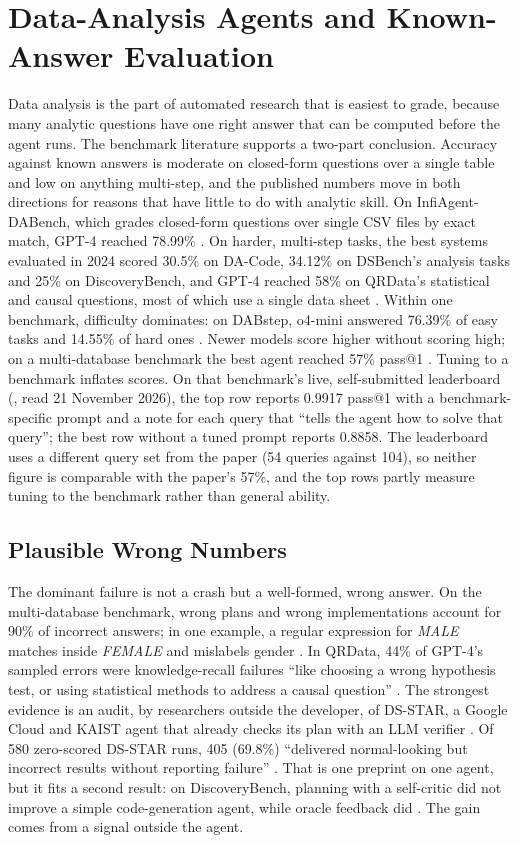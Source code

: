 \section{Data-Analysis Agents and Known-Answer Evaluation}\label{sec:data}

Data analysis is the part of automated research that is easiest to grade, because many analytic questions have one right answer that can be computed before the agent runs. The benchmark literature supports a two-part conclusion. Accuracy against known answers is moderate on closed-form questions over a single table and low on anything multi-step, and the published numbers move in both directions for reasons that have little to do with analytic skill. On InfiAgent-DABench, which grades closed-form questions over single CSV files by exact match, GPT-4 reached 78.99\% \citep{D1}. On harder, multi-step tasks, the best systems evaluated in 2024 scored 30.5\% on DA-Code, 34.12\% on DSBench's analysis tasks and 25\% on DiscoveryBench, and GPT-4 reached 58\% on QRData's statistical and causal questions, most of which use a single data sheet \citep{D2,D3,D6,D14}. Within one benchmark, difficulty dominates: on DABstep, o4-mini answered 76.39\% of easy tasks and 14.55\% of hard ones \citep{D9}. Newer models score higher without scoring high; on a multi-database benchmark the best agent reached 57\% pass@1 \citep{D11}. Tuning to a benchmark inflates scores. On that benchmark's live, self-submitted leaderboard (, read 21 November 2026), the top row reports 0.9917 pass@1 with a benchmark-specific prompt and a note for each query that ``tells the agent how to solve that query''; the best row without a tuned prompt reports 0.8858. The leaderboard uses a different query set from the paper (54 queries against 104), so neither figure is comparable with the paper's 57\%, and the top rows partly measure tuning to the benchmark rather than general ability.

\subsection{Plausible Wrong Numbers}

The dominant failure is not a crash but a well-formed, wrong answer. On the multi-database benchmark, wrong plans and wrong implementations account for 90\% of incorrect answers; in one example, a regular expression for \textit{MALE} matches inside \textit{FEMALE} and mislabels gender \citep{D11}. In QRData, 44\% of GPT-4's sampled errors were knowledge-recall failures ``like choosing a wrong hypothesis test, or using statistical methods to address a causal question'' \citep{D14}. The strongest evidence is an audit, by researchers outside the developer, of DS-STAR, a Google Cloud and KAIST agent that already checks its plan with an LLM verifier \citep{D16}. Of 580 zero-scored DS-STAR runs, 405 (69.8\%) ``delivered normal-looking but incorrect results without reporting failure'' \citep{D12}. That is one preprint on one agent, but it fits a second result: on DiscoveryBench, planning with a self-critic did not improve a simple code-generation agent, while oracle feedback did \citep{D6}. The gain comes from a signal outside the agent.

